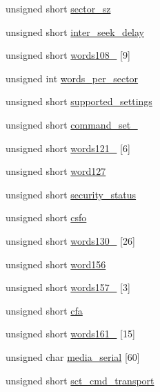 \begin{DoxyCompactItemize}
\item 
unsigned short \hyperlink{structSATA__ident_a36c839a543d3bc8ae5cc834591d0fda2}{sector\+\_\+sz}
\item 
unsigned short \hyperlink{structSATA__ident_a6d2b3ab59e6b5a3914cfc775ac7a273b}{inter\+\_\+seek\+\_\+delay}
\item 
unsigned short \hyperlink{structSATA__ident_a11cabfdf0f71c170262978bb08445d3a}{words108\+\_} \mbox{[}9\mbox{]}
\item 
unsigned int \hyperlink{structSATA__ident_a0c0d441c5e9cfd17d9dfa69c102ecafd}{words\+\_\+per\+\_\+sector}
\item 
unsigned short \hyperlink{structSATA__ident_ae8dec1fde7e95fc8810c1fc1a3849eff}{supported\+\_\+settings}
\item 
unsigned short \hyperlink{structSATA__ident_a8e97ec892f9b34e03fd3e118232cb33d}{command\+\_\+set\+\_}
\item 
unsigned short \hyperlink{structSATA__ident_a50b9d23ab1fe7bd099651c205b273ddc}{words121\+\_} \mbox{[}6\mbox{]}
\item 
unsigned short \hyperlink{structSATA__ident_a0304f0c077add497b87185216200fca1}{word127}
\item 
unsigned short \hyperlink{structSATA__ident_a103941b9ece90ff1df2c58e2fa2866d7}{security\+\_\+status}
\item 
unsigned short \hyperlink{structSATA__ident_a1ccb2068f8fe097ee7055f214b1f8416}{csfo}
\item 
unsigned short \hyperlink{structSATA__ident_ab65ec26c6dc0d14d5c7bd8981ec68d74}{words130\+\_} \mbox{[}26\mbox{]}
\item 
unsigned short \hyperlink{structSATA__ident_a56ba76f0701ac2544a8b69a54360915f}{word156}
\item 
unsigned short \hyperlink{structSATA__ident_a0ee80af77570613f9ba08c1bd30a90d5}{words157\+\_} \mbox{[}3\mbox{]}
\item 
unsigned short \hyperlink{structSATA__ident_a73387dc40b352ee650bd1a5875849e08}{cfa}
\item 
unsigned short \hyperlink{structSATA__ident_a876fd52ee84beddb2b5e9a1a99ce098e}{words161\+\_} \mbox{[}15\mbox{]}
\item 
unsigned char \hyperlink{structSATA__ident_a20fa3859f2745ac5a2f32cb5d5a6ed62}{media\+\_\+serial} \mbox{[}60\mbox{]}
\item 
unsigned short \hyperlink{structSATA__ident_ae181871bbc156f78608cb240648b113a}{sct\+\_\+cmd\+\_\+transport}
\item 

\end{DoxyCompactItemize}
